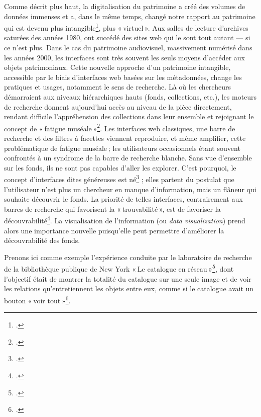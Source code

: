 Comme décrit plus haut, la digitalisation du patrimoine a créé des volumes de données immenses et a, dans le même temps, changé notre rapport au patrimoine qui est devenu plus intangible\footcite[p. 1]{windhager_visualization_2019}, plus « virtuel ». Aux salles de lecture d’archives saturées des années 1980, ont succédé des sites web qui le sont tout autant — si ce n’est plus. Dans le cas du patrimoine audiovisuel, massivement numérisé dans les années 2000, les interfaces sont très souvent les seuls moyens d’accéder aux objets patrimoniaux. Cette nouvelle approche d’un patrimoine intangible, accessible par le biais d’interfaces web basées sur les métadonnées, change les pratiques et usages, notamment le sens de recherche. Là où les chercheurs démarraient aux niveaux hiérarchiques hauts (fonds, collections, etc.), les moteurs de recherche donnent aujourd’hui accès au niveau de la pièce directement, rendant difficile l’appréhension des collections dans leur ensemble et rejoignant le concept de « fatigue muséale »\footcite[pp. 62-72]{gilman_museum_1916}. Les interfaces web classiques, une barre de recherche et des filtres à facettes viennent reproduire, et même amplifier, cette problématique de fatigue muséale ; les utilisateurs occasionnels étant souvent confrontés à un syndrome de la barre de recherche blanche. Sans vue d’ensemble sur les fonds, ils ne sont pas capables d’aller les explorer. C’est pourquoi, le concept d’interfaces dites généreuses est né\footcite[pp. 5-6]{windhager_orchestrating_2018} ; elles partent du postulat que l’utilisateur n’est plus un chercheur en manque d’information, mais un flâneur qui souhaite découvrir le fonds. La priorité de telles interfaces, contrairement aux barres de recherche qui favorisent la « trouvabilité », est de favoriser la découvrabilité\footcite[p. 18]{shen_generous_2023}. La visualisation de l’information (ou \textit{data visualization}) prend alors une importance nouvelle puisqu’elle peut permettre d'améliorer la découvrabilité des fonds.

Prenons ici comme exemple l’expérience conduite par le laboratoire de recherche de la bibliothèque publique de New York « Le catalogue en réseau »\footcite[§20 à §26]{lapotre_visualiser_2016}, dont l’objectif était de montrer la totalité du catalogue sur une seule image et de voir les relations qu’entretiennent les objets entre eux, comme si le catalogue avait un bouton « voir tout »\footcite{miller_networked_2014}.



